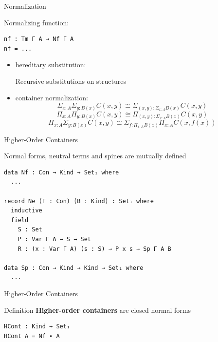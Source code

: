 \documentclass{beamer}
\begin{document}
\begin{frame}[fragile]{Normalization}

Normalizing function:

\begin{exampleblock}{}
\begin{verbatim}
nf : Tm Γ A → Nf Γ A
nf = ...
\end{verbatim}
\end{exampleblock}

\begin{itemize}
  \item hereditary substitution:\\
    \begin{center}
    Recursive substitutions on structures
    \end{center}
  \item container normalization:
    \[ \Sigma_{x:A} \Sigma_{y:B(x)} C(x,y) \cong \Sigma_{(x,y):\Sigma_{x:A} B(x)} C(x,y) \]
    \[ \Pi_{x:A} \Pi_{y:B(x)} C(x,y) \cong \Pi_{(x,y):\Sigma_{x:A} B(x)} C(x,y) \]
    \[ \Pi_{x:A} \Sigma_{y:B(x)} C(x,y) \cong \Sigma_{f:\Pi_{x:A} B(x)} \Pi_{x:A} C(x, f(x))\]
\end{itemize}
\end{frame}

\begin{frame}[fragile]{Higher-Order Containers}

Normal forms, neutral terms and spines are mutually defined

\begin{exampleblock}{}
\begin{verbatim}
data Nf : Con → Kind → Set₁ where
  ...

record Ne (Γ : Con) (B : Kind) : Set₁ where
  inductive
  field
    S : Set
    P : Var Γ A → S → Set
    R : (x : Var Γ A) (s : S) → P x s → Sp Γ A B

data Sp : Con → Kind → Kind → Set₁ where
  ...
\end{verbatim}
\end{exampleblock}
\end{frame}

\begin{frame}[fragile]{Higher-Order Containers}

\begin{block}{Definition}
\textbf{Higher-order containers} are closed normal forms
\end{block}

\begin{exampleblock}{}
\begin{verbatim}
HCont : Kind → Set₁
HCont A = Nf ∙ A
\end{verbatim}
\end{exampleblock}
\end{frame}
\end{document}
